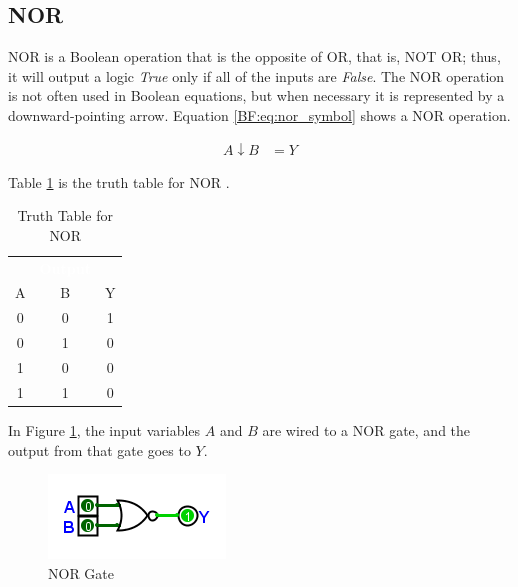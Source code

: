 \subsection{NOR}
\label{BF:subsec:nor}

\textsf{NOR}  is a Boolean operation that is the opposite of OR, that is, \textsf{NOT OR}; thus, it will output a logic \emph{True} only if all of the inputs are \emph{False}. The \textsf{NOR} operation is not often used in Boolean equations, but when necessary it is represented by a downward-pointing arrow. Equation \ref{BF:eq:nor_symbol} shows a \textsf{NOR} operation.

\begin{align}
  \label{BF:eq:nor_symbol}
  A \downarrow B &= Y 
\end{align}

Table \ref{BF:tab:truth_table_for_nor} is the truth table for \textsf{NOR} . 

\begin{table}[H]
  \sffamily
  \newcommand{\head}[1]{\textcolor{white}{\textbf{#1}}}    
  \begin{center}
    \begin{tabular}{ccc} 
      \rowcolor{black!75}
      \multicolumn{2}{c}{\head{Inputs}} & \head{Output} \\
      A & B & Y \\
      \hline
      0 & 0 & 1 \\
      0 & 1 & 0 \\
      1 & 0 & 0 \\
      1 & 1 & 0 
    \end{tabular}
  \end{center}
  \caption{Truth Table for NOR}
  \label{BF:tab:truth_table_for_nor}
\end{table}

In Figure \ref{fig:04_06}, the input variables $ A $ and $ B $ are wired to a \textsf{NOR}  gate, and the output from that gate goes to $ Y $. 

\begin{figure}[H]
	\centering
	\includegraphics[width=\maxwidth{.95\linewidth}]{gfx/04_06}
	\caption{NOR Gate}
	\label{fig:04_06}
\end{figure}


